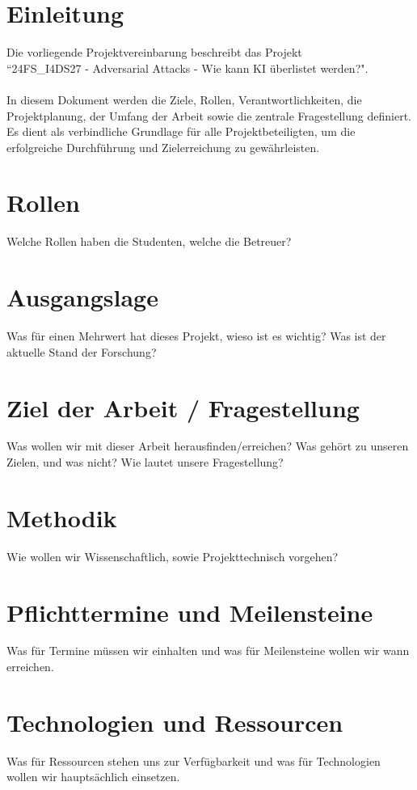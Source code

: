 \section{Einleitung}
Die vorliegende Projektvereinbarung beschreibt das Projekt \\ ``24FS\_I4DS27 - Adversarial Attacks - Wie kann KI überlistet werden?". \\ 
\\
In diesem Dokument werden die Ziele, Rollen, Verantwortlichkeiten, die Projektplanung, der Umfang der Arbeit sowie die zentrale Fragestellung definiert. Es dient als verbindliche Grundlage für alle Projektbeteiligten, um die erfolgreiche Durchführung und Zielerreichung zu gewährleisten.

\section{Rollen}
Welche Rollen haben die Studenten, welche die Betreuer?

\section{Ausgangslage}
Was für einen Mehrwert hat dieses Projekt, wieso ist es wichtig? Was ist der aktuelle Stand der Forschung?

\section{Ziel der Arbeit / Fragestellung}
Was wollen wir mit dieser Arbeit herausfinden/erreichen?
Was gehört zu unseren Zielen, und was nicht?
Wie lautet unsere Fragestellung?

\section{Methodik}
Wie wollen wir Wissenschaftlich, sowie Projekttechnisch vorgehen?

\section{Pflichttermine und Meilensteine}
Was für Termine müssen wir einhalten und was für Meilensteine wollen wir wann erreichen.

\section{Technologien und Ressourcen}
Was für Ressourcen stehen uns zur Verfügbarkeit und was für Technologien wollen wir hauptsächlich einsetzen.

